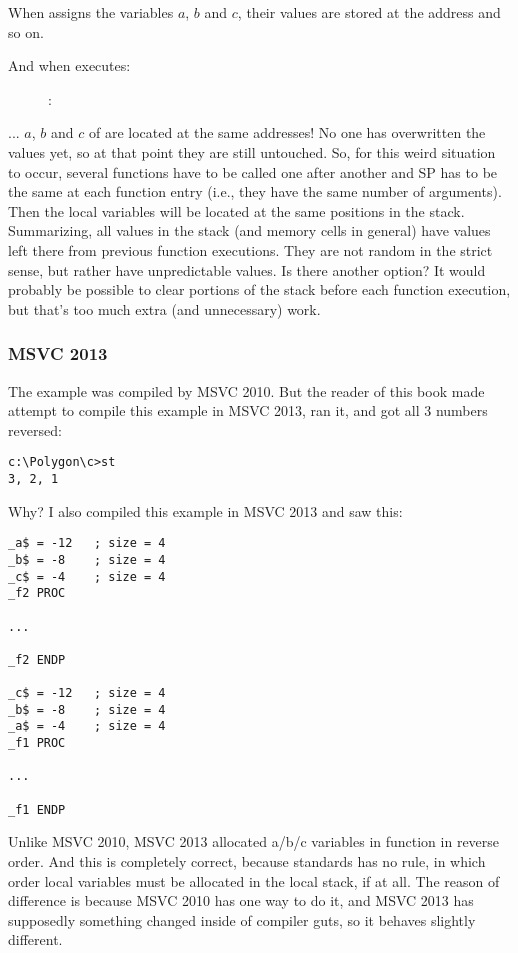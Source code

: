 When  assigns the variables $a$, $b$ and $c$, their values are stored at the address  and so on.

\clearpage
And when  executes:

\begin{figure}[H]
\centering
{}
\caption{\olly: }
\label{fig:stack_noise_olly2}
\end{figure}

... $a$, $b$ and $c$ of  are located at the same addresses!
No one has overwritten the values yet, so at that point they are still untouched.
So, for this weird situation to occur, several functions have to be called one after another and
\ac{SP} has to be the same at each function entry (i.e., they have the same number
of arguments). Then the local variables will be located at the same positions in the stack.
Summarizing, all values in the stack (and memory cells in general) have values left there from previous function executions.
They are not random in the strict sense, but rather have unpredictable values.
Is there another option?
It would probably be possible to clear portions of the stack before each function execution,
but that's too much extra (and unnecessary) work.

\subsubsection{MSVC 2013}

The example was compiled by MSVC 2010.
But the reader of this book made attempt to compile this example in MSVC 2013, ran it, and got all 3 numbers reversed:%

\begin{lstlisting}
c:\Polygon\c>st
3, 2, 1
\end{lstlisting}

Why?
I also compiled this example in MSVC 2013 and saw this:


\begin{lstlisting}[caption=MSVC 2013,style=customasmx86]
_a$ = -12	; size = 4
_b$ = -8	; size = 4
_c$ = -4	; size = 4
_f2	PROC

...

_f2	ENDP

_c$ = -12	; size = 4
_b$ = -8	; size = 4
_a$ = -4	; size = 4
_f1	PROC

...

_f1	ENDP
\end{lstlisting}

Unlike MSVC 2010, MSVC 2013 allocated a/b/c variables in function  in reverse order.%
And this is completely correct, because \CCpp standards has no rule, in which order local variables must be allocated in the local stack, if at all.
The reason of difference is because MSVC 2010 has one way to do it, and MSVC 2013 has supposedly something changed inside of compiler guts, so it behaves slightly different.


